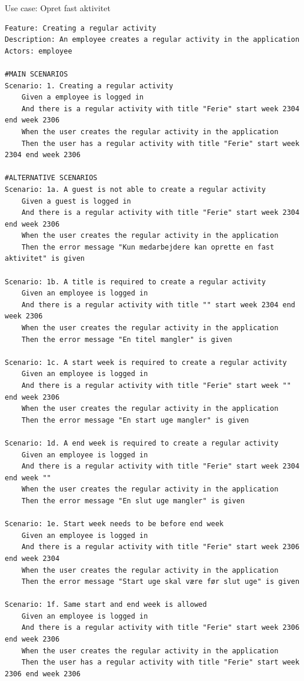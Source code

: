\begin{listing}[H]
    \centering
    \caption{Use case: Opret fast aktivitet}\label{lst:usecase_regular_activity}
    \begin{verbatim}  
Feature: Creating a regular activity
Description: An employee creates a regular activity in the application
Actors: employee

#MAIN SCENARIOS
Scenario: 1. Creating a regular activity
    Given a employee is logged in
    And there is a regular activity with title "Ferie" start week 2304 end week 2306 
    When the user creates the regular activity in the application 
    Then the user has a regular activity with title "Ferie" start week 2304 end week 2306

#ALTERNATIVE SCENARIOS
Scenario: 1a. A guest is not able to create a regular activity
    Given a guest is logged in
    And there is a regular activity with title "Ferie" start week 2304 end week 2306   
    When the user creates the regular activity in the application 
    Then the error message "Kun medarbejdere kan oprette en fast aktivitet" is given

Scenario: 1b. A title is required to create a regular activity
    Given an employee is logged in
    And there is a regular activity with title "" start week 2304 end week 2306 
    When the user creates the regular activity in the application 
    Then the error message "En titel mangler" is given

Scenario: 1c. A start week is required to create a regular activity
    Given an employee is logged in
    And there is a regular activity with title "Ferie" start week "" end week 2306 
    When the user creates the regular activity in the application 
    Then the error message "En start uge mangler" is given

Scenario: 1d. A end week is required to create a regular activity
    Given an employee is logged in
    And there is a regular activity with title "Ferie" start week 2304 end week "" 
    When the user creates the regular activity in the application 
    Then the error message "En slut uge mangler" is given

Scenario: 1e. Start week needs to be before end week
    Given an employee is logged in
    And there is a regular activity with title "Ferie" start week 2306 end week 2304 
    When the user creates the regular activity in the application 
    Then the error message "Start uge skal være før slut uge" is given

Scenario: 1f. Same start and end week is allowed
    Given an employee is logged in
    And there is a regular activity with title "Ferie" start week 2306 end week 2306 
    When the user creates the regular activity in the application 
    Then the user has a regular activity with title "Ferie" start week 2306 end week 2306
    \end{verbatim}
\end{listing}\newpage
